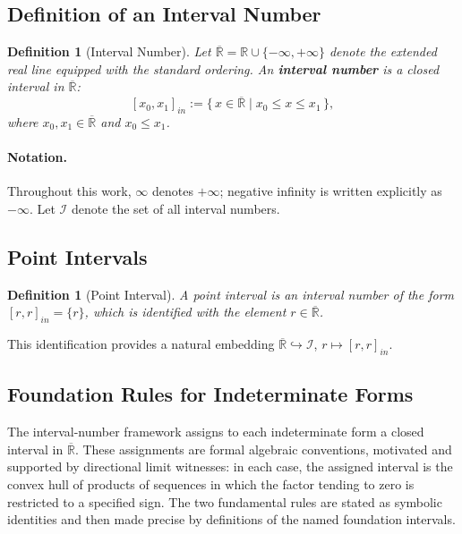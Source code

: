 \documentclass[11pt,a4paper]{article}
\theoremstyle{paperdef}
\newtheorem{definition}[theorem]{Definition}
\newcommand{\Rext}{\overline{\mathbb{R}}}
\newcommand{\Iset}{\mathcal{I}}
\newcommand{\inI}[1]{[#1]_{in}}
\begin{document}
\subsection{Definition of an Interval Number}

\begin{definition}[Interval Number]\label{def:interval-number}
Let $\Rext = \mathbb{R} \cup \{-\infty, +\infty\}$ denote the extended
real line equipped with the standard ordering. An \textbf{interval
number} is a closed interval in $\Rext$:
\[
\inI{x_0, x_1} := \{\, x \in \Rext \mid x_0 \le x \le x_1 \,\},
\]
where $x_0, x_1 \in \Rext$ and $x_0 \le x_1$.
\end{definition}

\paragraph{Notation.} Throughout this work, $\infty$ denotes
$+\infty$; negative infinity is written explicitly as $-\infty$. Let
$\Iset$ denote the set of all interval numbers.

\subsection{Point Intervals}

\begin{definition}[Point Interval]\label{def:point-interval}
A point interval is an interval number of the form
$\inI{r, r} = \{r\}$, which is identified with the element
$r \in \Rext$.
\end{definition}

This identification provides a natural embedding
$\Rext \hookrightarrow \Iset$, $r \mapsto \inI{r, r}$.

\subsection{Foundation Rules for Indeterminate Forms}\label{sec:foundation-rules}

The interval-number framework assigns to each indeterminate form a
closed interval in $\Rext$. These assignments are formal algebraic
conventions, motivated and supported by directional limit witnesses:
in each case, the assigned interval is the convex hull of products of
sequences in which the factor tending to zero is restricted to a
specified sign. The two fundamental rules are stated as symbolic
identities and then made precise by definitions of the named
foundation intervals.
\end{document}
